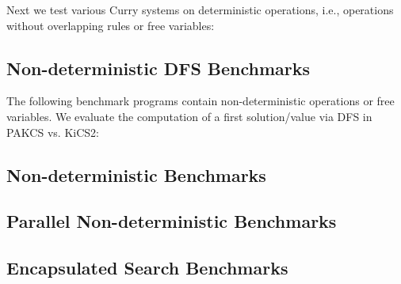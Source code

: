 \documentclass{article}
\begin{document}
Next we test various Curry systems on deterministic operations,
i.e., operations without overlapping rules or free variables:

\begin{center}
\end{center}

\subsection{Non-deterministic DFS Benchmarks}

The following benchmark programs contain non-deterministic operations
or free variables. We evaluate the computation of a
first solution/value via DFS in PAKCS vs. KiCS2:

\begin{center}
\end{center}

\subsection{Non-deterministic Benchmarks}

\begin{center}
\end{center}

\subsection{Parallel Non-deterministic Benchmarks}

\begin{center}
\end{center}

\subsection{Encapsulated Search Benchmarks}

\begin{center}
\end{center}
\end{document}
